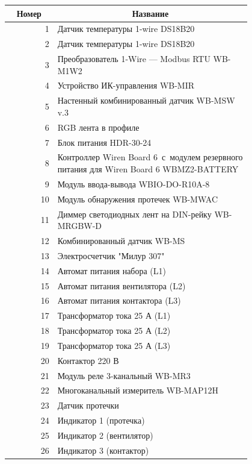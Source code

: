 \documentclass[a4paper,14pt]{extarticle}
\begin{document}
\begin{center}
	\begin{table}[htbp]
	\begin{tabular}{|r|p{0.8\linewidth}|}
		\hline
		\multicolumn{1}{|c|}{\textbf{Номер}} & \multicolumn{1}{c|}{\textbf{Название}} \\ \hline\hline
		1 & Датчик температуры 1-wire DS18B20 \\ \hline
		2 & Датчик температуры 1-wire DS18B20 \\ \hline
		3 & Преобразователь 1-Wire — Modbus RTU WB-M1W2 \\ \hline
		4 & Устройство ИК-управления WB-MIR \\ \hline
		5 & Настенный комбинированный датчик WB-MSW v.3 \\ \hline
		6 & RGB лента в профиле \\ \hline
		7 & Блок питания HDR-30-24 \\ \hline
		8 & Контроллер Wiren Board 6 с модулем резервного питания для Wiren Board 6 WBMZ2-BATTERY \\ \hline
		9 & Модуль ввода-вывода WBIO-DO-R10A-8 \\ \hline
		10 & Модуль обнаружения протечек WB-MWAC \\ \hline
		11 & Диммер светодиодных лент на DIN-рейку WB-MRGBW-D \\ \hline
		12 & Комбинированный датчик WB-MS \\ \hline
		13 & Электросчетчик "Милур 307" \\ \hline
		14 & Автомат питания набора (L1) \\ \hline
		15 & Автомат питания вентилятора (L2) \\ \hline
		16 & Автомат питания контактора (L3) \\ \hline
		17 & Трансформатор тока 25 А (L1) \\ \hline
		18 & Трансформатор тока 25 А (L2) \\ \hline
		19 & Трансформатор тока 25 А (L3) \\ \hline
		20 & Контактор 220 В \\ \hline
		21 & Модуль реле 3-канальный WB-MR3 \\ \hline
		22 & Многоканальный измеритель WB-MAP12H \\ \hline
		23 & Датчик протечки \\ \hline
		24 & Индикатор 1 (протечка) \\ \hline
		25 & Индикатор 2 (вентилятор) \\ \hline
		26 & Индикатор 3 (контактор) \\ \hline

\end{tabular}
\end{table}
\end{center}
\end{document}
